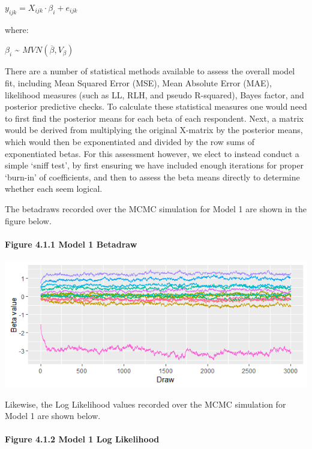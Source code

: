 \documentclass[]{article}
\let\oldparagraph\paragraph
\renewcommand{\paragraph}[1]{\oldparagraph{#1}\mbox{}}
\begin{document}
\(y_{ijk} = X_{ijk} \cdot \beta_{i} + e_{ijk}\)

where:

\(\beta_i\) \textasciitilde{}
\(MVN\left(\overline{\beta },V_{\beta}\right)\)

There are a number of statistical methods available to assess the
overall model fit, including Mean Squared Error (MSE), Mean Absolute
Error (MAE), likelihood measures (such as LL, RLH, and pseudo
R-squared), Bayes factor, and posterior predictive checks. To calculate
these statistical measures one would need to first find the posterior
means for each beta of each respondent. Next, a matrix would be derived
from multiplying the original X-matrix by the posterior means, which
would then be exponentiated and divided by the row sums of exponentiated
betas. For this assessment however, we elect to instead conduct a simple
`sniff test', by first ensuring we have included enough iterations for
proper `burn-in' of coefficients, and then to assess the beta means
directly to determine whether each seem logical.

\newpage

The betadraws recorded over the MCMC simulation for Model 1 are shown in
the figure below.

\paragraph{Figure 4.1.1 Model 1
Betadraw}\label{figure-4.1.1-model-1-betadraw}

\includegraphics{images/model1_betadraw.png}

Likewise, the Log Likelihood values recorded over the MCMC simulation
for Model 1 are shown below.

\paragraph{Figure 4.1.2 Model 1 Log
Likelihood}\label{figure-4.1.2-model-1-log-likelihood}
\end{document}
